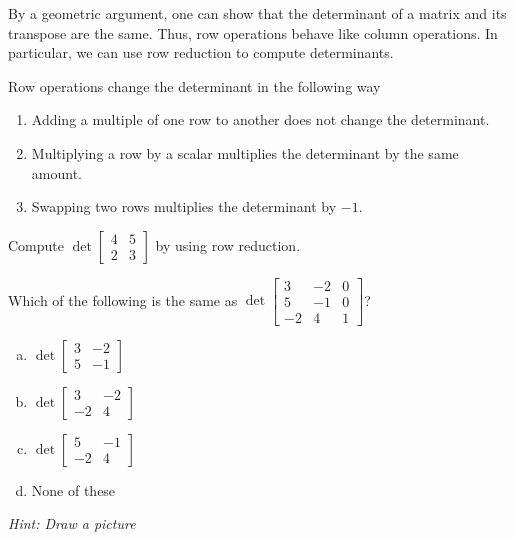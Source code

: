 
\begin{applicationActivities}{2}{26}

\begin{fact}
By a geometric argument, one can show that the determinant of a matrix and its transpose are the same.    Thus, row operations behave like column operations.  In particular, we can use row reduction to compute determinants.
\end{fact}

\begin{fact}
Row operations change the determinant in the following way
\begin{enumerate}
\item Adding a multiple of one row to another does not change the determinant.
\item Multiplying a row by a scalar multiplies the determinant by the same amount.
\item Swapping two rows multiplies the determinant by $-1$.
\end{enumerate}
\end{fact}

\begin{activity}{10}
  Compute $\det \begin{bmatrix} 4 & 5 \\ 2 & 3 \end{bmatrix}$ by using row reduction.
\end{activity}


\begin{activity}{10}
  Which of the following is the same as $\det \begin{bmatrix} 3 & -2 & 0 \\  5 & -1 & 0 \\  -2 & 4 & 1\end{bmatrix}$?
\begin{enumerate}[(a)]
\item $\det \begin{bmatrix} 3 & -2 \\ 5 & -1 \end{bmatrix}$
\item $\det \begin{bmatrix} 3 & -2 \\ -2 & 4 \end{bmatrix}$
\item $\det \begin{bmatrix} 5 & -1 \\ -2 & 4 \end{bmatrix}$
\item None of these
\end{enumerate}
{\em Hint: Draw a picture}
\end{activity}


\end{applicationActivities}
